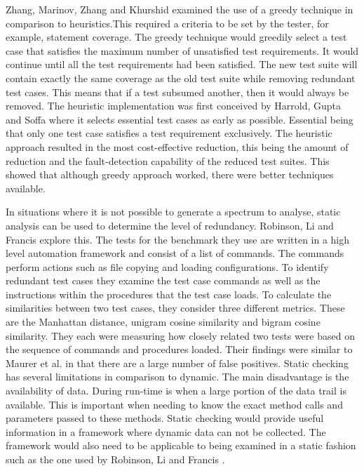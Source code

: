 Zhang, Marinov, Zhang and Khurshid \cite{zhang2011empirical} examined the use of a greedy technique in comparison to heuristics.This required a criteria to be set by the tester, for example, statement coverage. The greedy technique would greedily select a test case that satisfies the maximum number of unsatisfied test requirements. It would continue until all the test requirements had been satisfied. The new test suite will contain exactly the same coverage as the old test suite while removing redundant test cases. This means that if a test subsumed another, then it would always be removed. The heuristic implementation was first conceived by Harrold, Gupta and Soffa \cite{harrold1993methodology} where it selects essential test cases as early as possible. Essential being that only one test case satisfies a test requirement exclusively. The heuristic approach resulted in the most cost-effective reduction, this being the amount of reduction and the fault-detection capability of the reduced test suites. This showed that although greedy approach worked, there were better techniques available.

In situations where it is not possible to generate a spectrum to analyse, static analysis can be used to determine the level of redundancy. Robinson, Li and Francis \cite{li2008static} explore this. The tests for the benchmark they use are written in a high level automation framework and consist of a list of commands. The commands perform actions such as file copying and loading configurations. To identify redundant test cases they examine the test case commands as well as the instructions within the procedures that the test case loads. To calculate the similarities between two test cases, they consider three different metrics. These are the Manhattan distance, unigram cosine similarity and bigram cosine similarity. They each were measuring how closely related two tests were based on the sequence of commands and procedures loaded. Their findings were similar to Maurer et al. \cite{koochakzadeh2009test} in that there are a large number of false positives. Static checking has several limitations in comparison to dynamic. The main disadvantage is the availability of data. During run-time is when a large portion of the data trail is available. This is important when needing to know the exact method calls and parameters passed to these methods. Static checking would provide useful information in a framework where dynamic data can not be collected. The framework would also need to be applicable to being examined in a static fashion such as the one used by Robinson, Li and Francis \cite{li2008static}.

